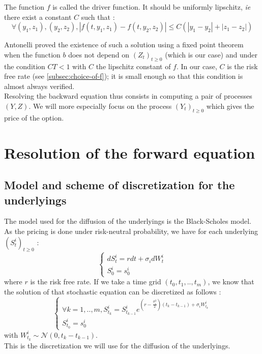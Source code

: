 \documentclass[a4paper,11pt,english]{book}
\begin{document}
The function $f$ is called the driver function. It should be uniformly lipschitz, \textit{ie} there exist a constant $C$ such that :
$$\forall (y_{1},z_{1}),(y_{2},z_{2}), |f(t,y_{1},z_{1})-f(t,y_{2},z_{2})|\leq C(|y_{1}-y_{2}|+|z_{1}-z_{2}|)$$

Antonelli \cite{antonelli1993backward} proved the existence of such a solution using a fixed point theorem when the function $b$ does not depend on $(Z_{t})_{t\geq0}$ (which is our case) and under the condition $CT<1$ with $C$ the lipschitz constant of $f$. In our case, $C$ is the risk free rate (see \ref{subsec:choice-of-f}); it is small enough so that this condition is almost always verified.\\

Resolving the backward equation thus consists in computing a pair of processes $(Y,Z)$. We will more especially focus on the process $(Y_{t})_{t\geq0}$ which gives the price of the option.

\section{Resolution of the forward equation}
\subsection{Model and scheme of discretization for the underlyings}
\label{subsec:underlying-discretization}
The model used for the diffusion of the underlyings is the Black-Scholes model. As the pricing is done under risk-neutral probability, we have for each underlying $(S^{i}_{t})_{t\geq0}$ :
$$
\left\{
    \begin{array}{ll}
        dS_{t}^{i}=rdt+\sigma_{i}dW_{t}^{i} \\
        S_{0}^{i}=s_{0}^{i} 
    \end{array}
\right.
$$
where $r$ is the risk free rate.
If we take a time grid $(t_{0},t_{1},..,t_{m})$, we know that the solution of that stochastic equation can be discretized as follows :
$$
\left\{
    \begin{array}{ll}
         \forall k=1,..,m,  S_{t_{k}}^{i}=S_{t_{k-1}}^{i}e^{(r-\frac{\sigma_{i}^{2}}{2})(t_{k}-t_{k-1})+\sigma_{i}W_{t_{k}}^{i}}\\
        S_{t_{0}}^{i}=s_{0}^{i} 
    \end{array}
\right.
$$
with $W_{t_{k}}^{i} \sim \mathcal{N}(0,t_{k}-t_{k-1})$.\\
This is the discretization we will use for the diffusion of the underlyings.
\end{document}
